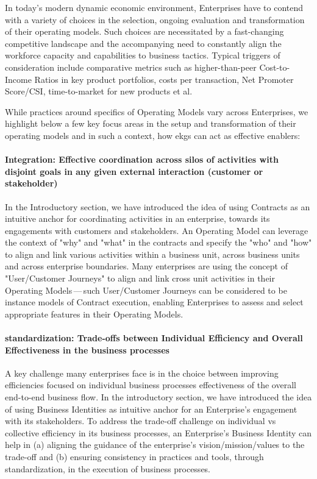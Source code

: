 In today's modern dynamic economic environment, Enterprises have to contend with a variety of choices in the selection,
ongoing evaluation and transformation of their operating models.
Such choices are necessitated by a fast-changing competitive landscape and the accompanying need to constantly
align the workforce capacity and capabilities to business tactics.
Typical triggers of consideration include comparative metrics such as higher-than-peer Cost-to-Income Ratios
in key product portfolios, costs per transaction, Net Promoter Score/CSI, time-to-market for new products et al.

While practices around specifics of Operating Models vary across Enterprises, we highlight below a few key focus
areas in the setup and transformation of their operating models and in such a context,
how \glspl{ekg} can act as effective enablers:

\paragraph*{Integration: Effective coordination across silos of activities with disjoint goals in any
given external interaction (customer or stakeholder)}

In the Introductory section, we have introduced the idea of using Contracts as an intuitive anchor for
coordinating activities in an enterprise, towards its engagements with customers and stakeholders.
An Operating Model can leverage the context of "why" and "what" in the contracts and specify the "who" and "how"
to align and link various activities within a business unit, across business units and across enterprise boundaries.
Many enterprises are using the concept of "User/Customer Journeys" to align and link cross unit activities in their
Operating Models\,---\,such User/Customer Journeys can be considered to be instance models of Contract execution,
enabling Enterprises to assess and select appropriate features in their Operating Models.

\paragraph*{standardization: Trade-offs between Individual Efficiency and
Overall Effectiveness in the business processes}

A key challenge many enterprises face is in the choice between improving efficiencies focused on individual
business processes  effectiveness of the overall end-to-end business flow.
In the introductory section, we have introduced the idea of using Business Identities as intuitive anchor for
an Enterprise’s engagement with its stakeholders.
To address the trade-off challenge on individual vs collective efficiency in its business processes,
an Enterprise’s Business Identity can help in
(a) aligning the guidance of the enterprise's vision/mission/values to the trade-off and
(b) ensuring consistency in practices and tools, through standardization, in the execution of business processes.

